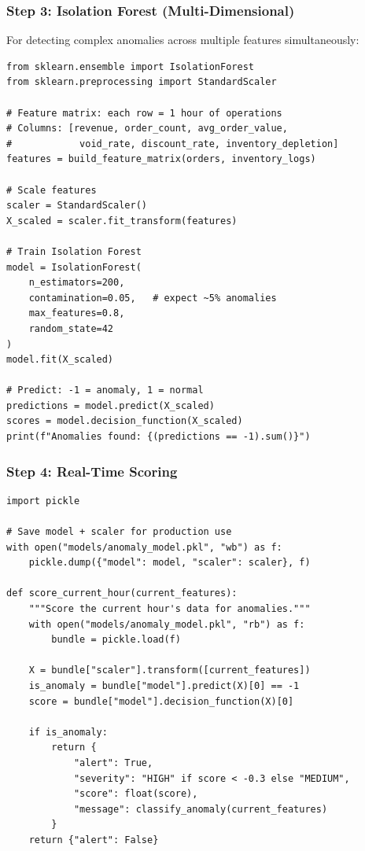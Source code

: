 \documentclass[12pt, a4paper]{article}
\begin{document}
\subsubsection{Step 3: Isolation Forest (Multi-Dimensional)}

For detecting complex anomalies across multiple features simultaneously:

\begin{lstlisting}
from sklearn.ensemble import IsolationForest
from sklearn.preprocessing import StandardScaler

# Feature matrix: each row = 1 hour of operations
# Columns: [revenue, order_count, avg_order_value,
#            void_rate, discount_rate, inventory_depletion]
features = build_feature_matrix(orders, inventory_logs)

# Scale features
scaler = StandardScaler()
X_scaled = scaler.fit_transform(features)

# Train Isolation Forest
model = IsolationForest(
    n_estimators=200,
    contamination=0.05,   # expect ~5% anomalies
    max_features=0.8,
    random_state=42
)
model.fit(X_scaled)

# Predict: -1 = anomaly, 1 = normal
predictions = model.predict(X_scaled)
scores = model.decision_function(X_scaled)
print(f"Anomalies found: {(predictions == -1).sum()}")
\end{lstlisting}


\subsubsection{Step 4: Real-Time Scoring}
\begin{lstlisting}
import pickle

# Save model + scaler for production use
with open("models/anomaly_model.pkl", "wb") as f:
    pickle.dump({"model": model, "scaler": scaler}, f)

def score_current_hour(current_features):
    """Score the current hour's data for anomalies."""
    with open("models/anomaly_model.pkl", "rb") as f:
        bundle = pickle.load(f)
    
    X = bundle["scaler"].transform([current_features])
    is_anomaly = bundle["model"].predict(X)[0] == -1
    score = bundle["model"].decision_function(X)[0]
    
    if is_anomaly:
        return {
            "alert": True,
            "severity": "HIGH" if score < -0.3 else "MEDIUM",
            "score": float(score),
            "message": classify_anomaly(current_features)
        }
    return {"alert": False}
\end{lstlisting}
\end{document}
